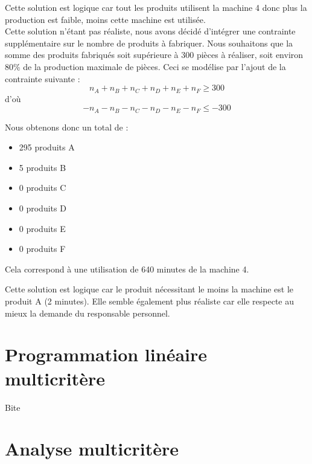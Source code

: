\documentclass[a4paper,10pt]{article}
\begin{document}
Cette solution est logique car tout les produits utilisent la machine 4 donc plus la production est faible, moins cette machine est utilisée.\\

Cette solution n'étant pas réaliste, nous avons décidé d'intégrer une contrainte supplémentaire sur le nombre de produits à fabriquer. Nous souhaitons que la somme des produits fabriqués soit supérieure à 300 pièces à réaliser, soit environ 80\% de la production maximale de pièces.
Ceci se modélise par l'ajout de la contrainte suivante :\\

$$n_A + n_B + n_C + n_D + n_E + n_F \geq 300$$
d'où $$-n_A -n_B -n_C -n_D -n_E -n_F \leq -300$$

Nous obtenons donc un total de :\newline
\begin{itemize}
\item[\textbullet] 295 produits A
\item[\textbullet] 5 produits B
\item[\textbullet] 0 produits C
\item[\textbullet] 0 produits D
\item[\textbullet] 0 produits E
\item[\textbullet] 0 produits F\newline
\end{itemize}
Cela correspond à une utilisation de 640 minutes de la machine 4.\newline

Cette solution est logique car le produit nécessitant le moins la machine est le produit A (2 minutes). Elle semble également plus réaliste car elle respecte au mieux la demande du responsable personnel.



\part{Programmation linéaire multicritère}

Bite %


\part{Analyse multicritère}
\end{document}
